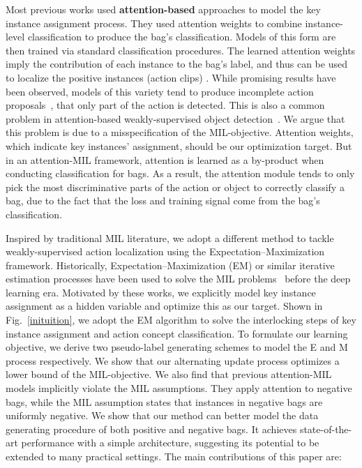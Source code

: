 \documentclass[runningheads]{llncs}
\begin{document}
\smallskip
Most previous works used \textbf{attention-based} approaches to model the key instance assignment process. They used attention weights to combine instance-level classification to produce the bag's classification. Models of this form are then trained via standard classification procedures. The learned attention weights imply the contribution of each instance to the bag's label, and thus can be used to localize the positive instances (action clips) \cite{nguyen2018weakly,wang2017untrimmednets}. While promising results have been observed, models of this variety tend to produce incomplete action proposals~\cite{liu2019completeness,yuan2019marginalized}, that only part of the action is detected. This is also a common problem in attention-based weakly-supervised object detection~\cite{Li_2019_ICCV,CMIL}. We argue that this problem is due to a misspecification of the MIL-objective. Attention weights, which indicate key instances' assignment, should be our optimization target. But in an attention-MIL framework, attention is learned as a by-product when conducting classification for bags. As a result, the attention module tends to only pick the most discriminative parts of the action or object to correctly classify a bag, due to the fact that the loss and training signal come from the bag's classification.

\smallskip
Inspired by traditional MIL literature, we adopt a different method to tackle weakly-supervised action localization using the Expectation–Maximization framework. Historically, Expectation–Maximization (EM) or similar iterative estimation processes have been used to solve the MIL problems~\cite{rectanglesMIL,Dooly01multiple-instancelearning,EM_DD} before the deep learning era. Motivated by these works, we explicitly model key instance assignment as a hidden variable and optimize this as our target. Shown in Fig.~\ref{inituition}, we adopt the EM algorithm to solve the interlocking steps of key instance assignment and action concept classification. To formulate our learning objective, we derive two pseudo-label generating schemes to model the E and M process respectively. We show that our alternating update process optimizes a lower bound of the MIL-objective. We also find that previous attention-MIL models implicitly violate the MIL assumptions. They apply attention to negative bags, while the MIL assumption states that instances in negative bags are uniformly negative. We show that our method can better model the data generating procedure of both positive and negative bags. It achieves state-of-the-art performance with a simple architecture, suggesting its potential to be extended to many practical settings. The main contributions of this paper are:
\end{document}
